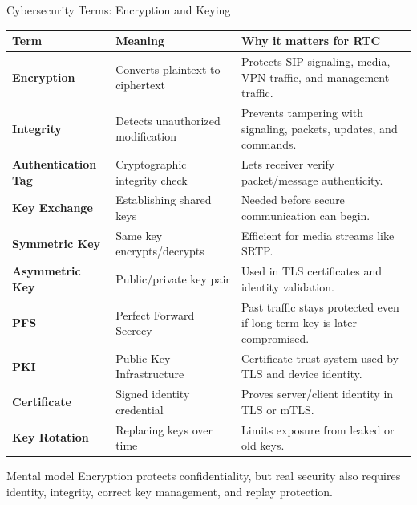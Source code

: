 \documentclass[aspectratio=169]{beamer}
\begin{document}
\begin{frame}{Cybersecurity Terms: Encryption and Keying}
\tiny
\begin{tabular}{p{2.2cm} p{3.5cm} p{6.5cm}}
\toprule
\textbf{Term} & \textbf{Meaning} & \textbf{Why it matters for RTC} \\
\midrule
\textbf{Encryption} & Converts plaintext to ciphertext & Protects SIP signaling, media, VPN traffic, and management traffic. \\
\textbf{Integrity} & Detects unauthorized modification & Prevents tampering with signaling, packets, updates, and commands. \\
\textbf{Authentication Tag} & Cryptographic integrity check & Lets receiver verify packet/message authenticity. \\
\textbf{Key Exchange} & Establishing shared keys & Needed before secure communication can begin. \\
\textbf{Symmetric Key} & Same key encrypts/decrypts & Efficient for media streams like SRTP. \\
\textbf{Asymmetric Key} & Public/private key pair & Used in TLS certificates and identity validation. \\
\textbf{PFS} & Perfect Forward Secrecy & Past traffic stays protected even if long-term key is later compromised. \\
\textbf{PKI} & Public Key Infrastructure & Certificate trust system used by TLS and device identity. \\
\textbf{Certificate} & Signed identity credential & Proves server/client identity in TLS or mTLS. \\
\textbf{Key Rotation} & Replacing keys over time & Limits exposure from leaked or old keys. \\
\bottomrule
\end{tabular}

\vspace{0.15cm}
\begin{block}{Mental model}
Encryption protects confidentiality, but real security also requires identity, integrity, correct key management, and replay protection.
\end{block}
\end{frame}
\end{document}
